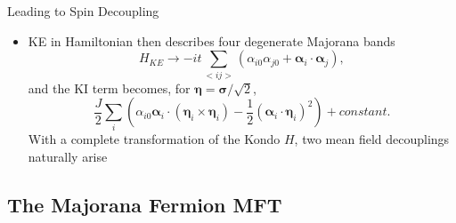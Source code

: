 \documentclass{beamer}
\begin{document}
\begin{frame}{Leading to Spin Decoupling}
    
    \begin{itemize}
        \item KE in Hamiltonian then describes four degenerate Majorana bands
        \[
        {\displaystyle
        H_{KE} \to -it\sum_{<ij>} (\alpha_{i0}\alpha_{j0} + \boldsymbol\alpha_i \cdot \boldsymbol\alpha_j),
        }
        \]
        and the KI term becomes, for $\boldsymbol\eta = \boldsymbol\sigma /\sqrt{2}$,
        \[
        {\displaystyle
        \frac{J}{2} \sum_i \left(\alpha_{i0} \boldsymbol\alpha_i \cdot (\boldsymbol\eta_i\times\boldsymbol\eta_i) - \frac{1}{2}(\boldsymbol\alpha_i \cdot \boldsymbol\eta_i)^2\right) + constant.
        }
        \]
        With a complete transformation of the Kondo $H$, two mean field decouplings naturally arise
        
    \end{itemize}
    
\end{frame}




\subsection{The Majorana Fermion MFT}
\end{document}
